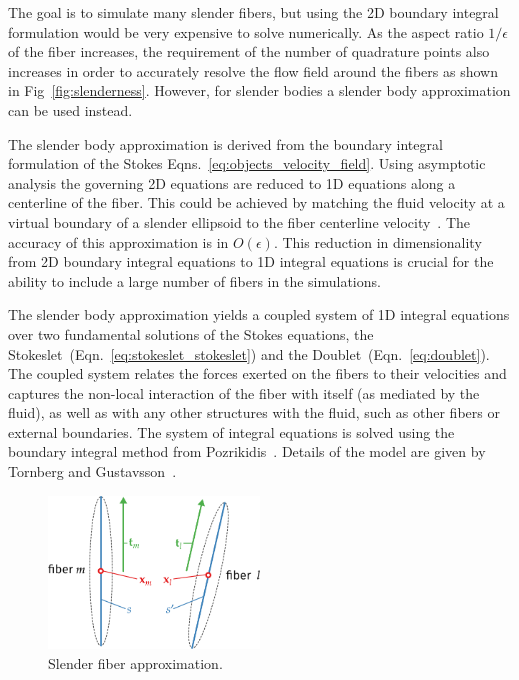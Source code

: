 The goal is to simulate many slender fibers, but using the 2D boundary integral formulation would be very expensive to solve numerically. As the aspect ratio $1/\epsilon$ of the fiber increases, the requirement of the number of quadrature points also increases in order to accurately resolve the flow field around the fibers as shown in Fig~\ref{fig:slenderness}. However, for slender bodies a slender body approximation can be used instead. 

The slender body approximation is derived from the boundary integral formulation of the Stokes Eqns.~\eqref{eq:objects_velocity_field}. Using asymptotic analysis the governing 2D equations are reduced to 1D equations along a centerline of the fiber. This could be achieved by matching the fluid velocity at a virtual boundary of a slender ellipsoid to the fiber centerline velocity~\cite{Gotz2000}. The accuracy of this approximation is in $O(\epsilon).$ This reduction in dimensionality from 2D boundary integral equations to 1D integral equations is crucial for the ability to include a large number of fibers in the simulations.

The slender body approximation yields a coupled system of 1D integral equations over two fundamental solutions of the Stokes equations, the Stokeslet~(Eqn.~\eqref{eq:stokeslet_stokeslet}) and the Doublet~(Eqn.~\eqref{eq:doublet}). The coupled system relates the forces exerted on the fibers to their velocities and captures the non-local interaction of the fiber with itself (as mediated by the fluid), as well as with any other structures with the fluid, such as other fibers or external boundaries. The system of integral equations is solved using the boundary integral method from Pozrikidis~\cite{Pozrikidis1992}. Details of the model are given by Tornberg and Gustavsson~\cite{Tornberg2006}.

\begin{figure}[!htbp]
  \centering
  \includegraphics[width=0.5\textwidth]{img/slender.pdf}
  \caption{Slender fiber approximation.}
  \label{fig:slender_fiber}
\end{figure}

